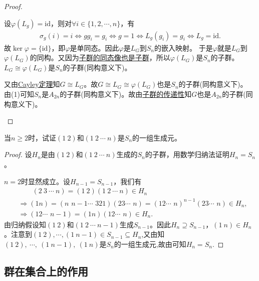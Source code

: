 \documentclass[../../main.tex]{subfiles}%
\begin{document}
\begin{proof}
\begin{enumerate}[(1)]
设$\varphi(L_g)=\mathrm{id}$，则对$\forall i\in\{1,2,\cdots,n\}$，有\begin{align*}
\sigma_g(i)=i\Longleftrightarrow gg_i=g_i\Longleftrightarrow g=1\Longleftrightarrow L_g(g_i)=g_i\Longleftrightarrow L_g=\mathrm{id}.
\end{align*}
故$\ker\varphi=\{\mathrm{id}\}$，即$\varphi$是单同态。因此$\varphi$是$L_G$到$S_n$的嵌入映射。
于是$\varphi$就是$L_G$到$\varphi(L_G)$的同构。又因为\hyperref[theorem:群同态与同构的基本性质-3]{子群的同态像也是子群}，所以$\varphi(L_G)$是$S_n$的子群。$L_G\cong\varphi(L_G)$是$S_n$的子群(同构意义下)。

又由\hyperref[theorem:抽象代数-Cayley定理-定理 1.5.1]{Cayley定理}知$G\cong L_G$。故$G\cong L_G\cong\varphi(L_G)$也是$S_n$的子群(同构意义下)。
由(1)可知$S_n$是$A_{2n}$的子群(同构意义下)。故由\hyperref[proposition:抽象代数---子群的基本性质-0]{子群的传递性}知$G$也是$A_{2n}$的子群(同构意义下)。
\end{enumerate}

\end{proof}

\begin{example}
当$n\geqslant 2$时，试证$(1\ 2)$和$(1\ 2\ \cdots\ n)$是$S_n$的一组生成元。
\end{example}
\begin{proof}

设$H_n$是由$(1\ 2)$和$(1\ 2\ \cdots\ n)$生成的$S_n$的子群，用数学归纳法证明$H_n=S_n$。

$n=2$时显然成立。设$H_{n-1}=S_{n-1}$，我们有
\begin{align*}
&\quad\quad (2\ 3\ \cdots\ n) = (1\ 2)(1\ 2\ \cdots\ n) \in H_n
\\
&\Longrightarrow (1 n)=(n\,\,n-1 \cdots \,\,3 2 1)(2 3 \cdots \,\,n)=(1 2 \cdots \,\,n)^{n-1}(2 3 \cdots \,\,n)\in H_n,
\\
&\Longrightarrow (1 2 \cdots \,\,n-1)=(1 n)(1 2 \cdots \,\,n)\in H_n.
\end{align*}
由归纳假设知$(1\ 2)$和$(1\ 2\ \cdots\ n-1)$生成$S_{n-1}$。因此$H_n \supseteq S_{n-1}$，$(1\ n) \in H_n$。注意到$(1\ 2),\cdots ,(1\ n-1)\in S_{n-1}\subseteq H_n$,又由知$(1\ 2),\ \cdots,\ (1\ n-1),\ (1\ n)$是$S_n$的一组生成元,故由可知$H_n=S_n$.

\end{proof}


\subsection{群在集合上的作用}
\end{document}
